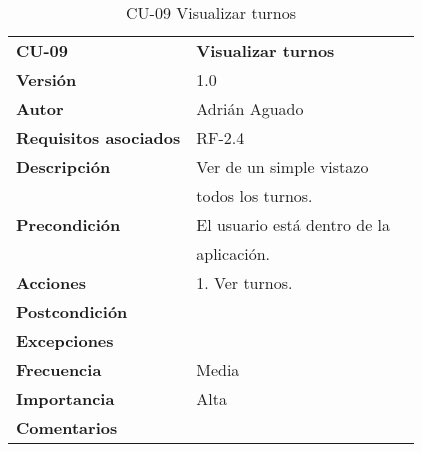 \begin{table}
\begin{tabular}{llr}  
\toprule
\begin{minipage}[b]{0.24\columnwidth}\raggedright\strut
\textbf{CU-09}\strut
\end{minipage} & \begin{minipage}[b]{0.72\columnwidth}\raggedright\strut
\textbf{ Visualizar turnos}\strut
\end{minipage}\tabularnewline
\cmidrule(r){1-2}
\textbf{Versión}       & 1.0           \\
\textbf{Autor}       & Adrián  Aguado    \\
\textbf{Requisitos asociados}       & RF-2.4 \\ 
\textbf{Descripción} & Ver de un simple vistazo \\
&todos los turnos. \\
\textbf{Precondición} & El usuario está dentro de la \\
& aplicación.       \\
\textbf{Acciones} & 1. Ver turnos. \\
\textbf{Postcondición} &   \\
\textbf{Excepciones} &     \\
\textbf{Frecuencia} & Media          \\
\textbf{Importancia} & Alta            \\
\textbf{Comentarios } &      \\
\bottomrule
\end{tabular}
\caption{CU-09 Visualizar turnos} 
\end{table}

